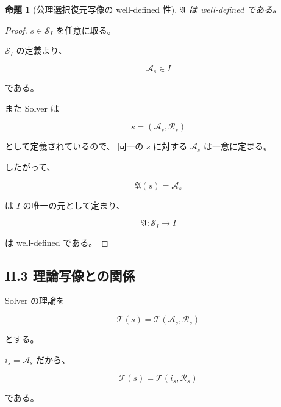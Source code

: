 \documentclass[a4paper,11pt]{article}
\newtheorem{proposition}[definition]{命題}
\newcommand{\Solver}{\mathcal{S}}
\newcommand{\Aset}{\mathcal{A}}
\newcommand{\Rset}{\mathcal{R}}
\begin{document}
\begin{proposition}[公理選択復元写像の well-defined 性]
$\mathfrak{A}$ は well-defined である。
\end{proposition}

\begin{proof}
$s\in\Solver_I$ を任意に取る。

$\Solver_I$ の定義より、

\begin{equation}
    \Aset_s\in I
\end{equation}

である。

また Solver は

\begin{equation}
    s=(\Aset_s,\Rset_s)
\end{equation}

として定義されているので、
同一の $s$ に対する $\Aset_s$ は一意に定まる。

したがって、

\begin{equation}
    \mathfrak{A}(s)=\Aset_s
\end{equation}

は $I$ の唯一の元として定まり、

\begin{equation}
    \mathfrak{A}:\Solver_I\to I
\end{equation}

は well-defined である。
\end{proof}


\subsection{H.3 理論写像との関係}

Solver の理論を

\begin{equation}
    \mathcal{T}(s)
    =
    \mathcal{T}(\Aset_s,\Rset_s)
\end{equation}

とする。

$ i_s=\Aset_s $ だから、

\begin{equation}
    \boxed{
        \mathcal{T}(s)
        =
        \mathcal{T}(i_s,\Rset_s)
    }
\end{equation}

である。
\end{document}
